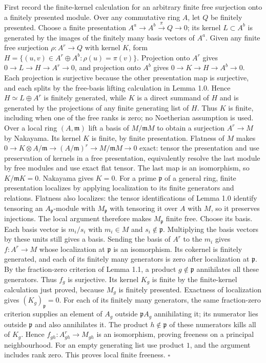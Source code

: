 \documentclass[11pt,a4paper,openany]{report}
\begin{document}
First record the finite-kernel calculation for an arbitrary finite free surjection onto a finitely presented module. Over any commutative ring \(A\), let \(Q\) be finitely presented. Choose a finite presentation \(A^a\to A^b\xrightarrow{\pi}Q\to0\); its kernel \(L\subset A^b\) is generated by the images of the finitely many basis vectors of \(A^a\). Given any finite free surjection \(\rho:A^r\to Q\) with kernel \(K\), form \(H=\{(u,v)\in A^r\oplus A^b:\rho(u)=\pi(v)\}\). Projection onto \(A^r\) gives \(0\to L\to H\to A^r\to0\), and projection onto \(A^b\) gives \(0\to K\to H\to A^b\to0\). Each projection is surjective because the other presentation map is surjective, and each splits by the free-basis lifting calculation in Lemma 1.0. Hence \(H\simeq L\oplus A^r\) is finitely generated, while \(K\) is a direct summand of \(H\) and is generated by the projections of any finite generating list of \(H\). Thus \(K\) is finite, including when one of the free ranks is zero; no Noetherian assumption is used. Over a local ring \((A,\mathfrak m)\) lift a basis of \(M/\mathfrak m M\) to obtain a surjection \(A^r\to M\) by Nakayama. Its kernel \(K\) is finite, by finite presentation. Flatness of \(M\) makes \(0\to K\otimes A/\mathfrak m\to (A/\mathfrak m)^r\to M/\mathfrak mM\to0\) exact: tensor the presentation and use preservation of kernels in a free presentation, equivalently resolve the last module by free modules and use exact flat tensor. The last map is an isomorphism, so \(K/\mathfrak mK=0\). Nakayama gives \(K=0\). For a prime \(\mathfrak p\) of a general ring, finite presentation localizes by applying localization to its finite generators and relations. Flatness also localizes: the tensor identifications of Lemma 1.0 identify tensoring an \(A_{\mathfrak p}\)-module with \(M_{\mathfrak p}\) with tensoring it over \(A\) with \(M\), so it preserves injections. The local argument therefore makes \(M_{\mathfrak p}\) finite free. Choose its basis. Each basis vector is \(m_i/s_i\) with \(m_i\in M\) and \(s_i\notin\mathfrak p\). Multiplying the basis vectors by these units still gives a basis. Sending the basis of \(A^r\) to the \(m_i\) gives \(f:A^r\to M\) whose localization at \(\mathfrak p\) is an isomorphism. Its cokernel is finitely generated, and each of its finitely many generators is zero after localization at \(\mathfrak p\). By the fraction-zero criterion of Lemma 1.1, a product \(g\notin\mathfrak p\) annihilates all these generators. Thus \(f_g\) is surjective. Its kernel \(K_g\) is finite by the finite-kernel calculation just proved, because \(M_g\) is finitely presented. Exactness of localization gives \((K_g)_{\mathfrak p}=0\). For each of its finitely many generators, the same fraction-zero criterion supplies an element of \(A_g\) outside \(\mathfrak p A_g\) annihilating it; its numerator lies outside \(\mathfrak p\) and also annihilates it. The product \(h\notin\mathfrak p\) of these numerators kills all of \(K_g\). Hence \(f_{gh}:A_{gh}^r\to M_{gh}\) is an isomorphism, proving freeness on a principal neighbourhood. For an empty generating list use product \(1\), and the argument includes rank zero. This proves local finite freeness. \(\square\)
\end{document}
